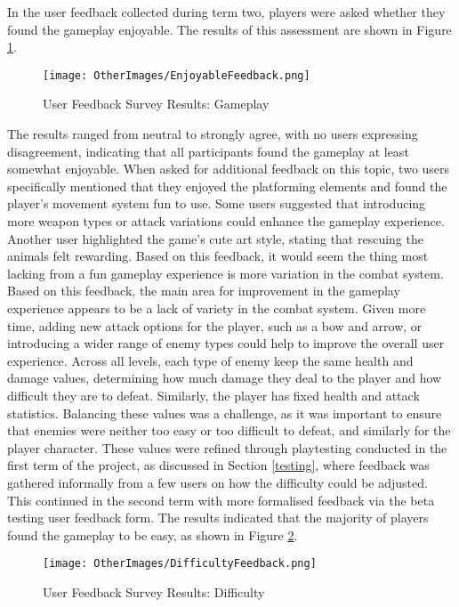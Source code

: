 \documentclass[10pt]{final_report}
\begin{document}
In the user feedback collected during term two, players were asked whether they found the gameplay enjoyable. The results of this assessment are shown in Figure \ref{fig:label_funfeedback}.
\begin{figure}[H]
    \centering
    \texttt{[image: OtherImages/EnjoyableFeedback.png]}
    \caption{User Feedback Survey Results: Gameplay}
    \label{fig:label_funfeedback}
\end{figure}
The results ranged from neutral to strongly agree, with no users expressing disagreement, indicating that all participants found the gameplay at least somewhat enjoyable. When asked for additional feedback on this topic, two users specifically mentioned that they enjoyed the platforming elements and found the player’s movement system fun to use. Some users suggested that introducing more weapon types or attack variations could enhance the gameplay experience. Another user highlighted the game’s cute art style, stating that rescuing the animals felt rewarding. Based on this feedback, it would seem the thing most lacking from a fun gameplay experience is more variation in the combat system. Based on this feedback, the main area for improvement in the gameplay experience appears to be a lack of variety in the combat system. Given more time, adding new attack options for the player, such as a bow and arrow, or introducing a wider range of enemy types could help to improve the overall user experience. \newline
Across all levels, each type of enemy keep the same health and damage values, determining how much damage they deal to the player and how difficult they are to defeat. Similarly, the player has fixed health and attack statistics. Balancing these values was a challenge, as it was important to ensure that enemies were neither too easy or too difficult to defeat, and similarly for the player character. These values were refined through playtesting conducted in the first term of the project, as discussed in Section \ref{testing}, where feedback was gathered informally from a few users on how the difficulty could be adjusted. This continued in the second term with more formalised feedback via the beta testing user feedback form. The results indicated that the majority of players found the gameplay to be easy, as shown in Figure \ref{fig:label_difficultyfeedback}.

\begin{figure}[H]
    \centering
    \texttt{[image: OtherImages/DifficultyFeedback.png]}
    \caption{User Feedback Survey Results: Difficulty}
    \label{fig:label_difficultyfeedback}
\end{figure}
\end{document}
